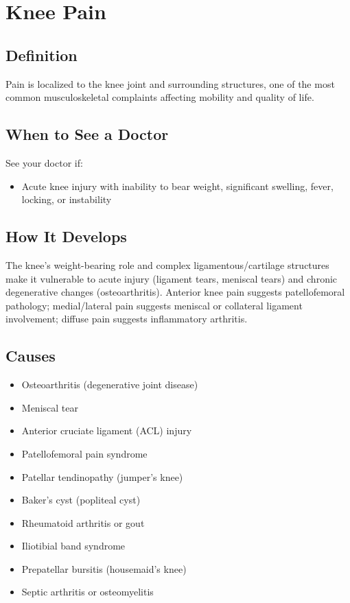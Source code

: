 \chapter{Knee Pain}

\section*{Definition}
Pain is localized to the knee joint and surrounding structures, one of the most common musculoskeletal complaints affecting mobility and quality of life.

\section*{When to See a Doctor}
See your doctor if:
\begin{itemize}
  \item Acute knee injury with inability to bear weight, significant swelling, fever, locking, or instability
\end{itemize}

\section*{How It Develops}
The knee's weight-bearing role and complex ligamentous/cartilage structures make it vulnerable to acute injury (ligament tears, meniscal tears) and chronic degenerative changes (osteoarthritis). Anterior knee pain suggests patellofemoral pathology; medial/lateral pain suggests meniscal or collateral ligament involvement; diffuse pain suggests inflammatory arthritis.

\section*{Causes}
\begin{itemize}
  \item Osteoarthritis (degenerative joint disease)
  \item Meniscal tear
  \item Anterior cruciate ligament (ACL) injury
  \item Patellofemoral pain syndrome
  \item Patellar tendinopathy (jumper's knee)
  \item Baker's cyst (popliteal cyst)
  \item Rheumatoid arthritis or gout
  \item Iliotibial band syndrome
  \item Prepatellar bursitis (housemaid's knee)
  \item Septic arthritis or osteomyelitis
\end{itemize}

